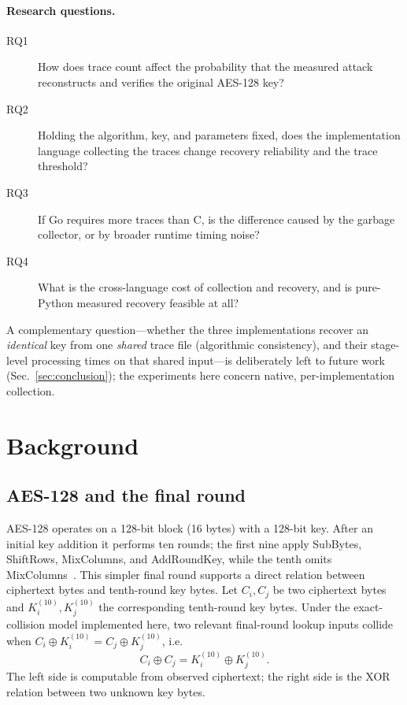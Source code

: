 \documentclass[11pt]{article}
\begin{document}
\paragraph{Research questions.}
\begin{description}
  \item[RQ1] How does trace count affect the probability that the measured
        attack reconstructs and verifies the original AES-128 key?
  \item[RQ2] Holding the algorithm, key, and parameters fixed, does the
        implementation language collecting the traces change recovery
        reliability and the trace threshold?
  \item[RQ3] If Go requires more traces than C, is the difference caused by the
        garbage collector, or by broader runtime timing noise?
  \item[RQ4] What is the cross-language cost of collection and recovery, and is
        pure-Python measured recovery feasible at all?
\end{description}
A complementary question---whether the three implementations recover an
\emph{identical} key from one \emph{shared} trace file (algorithmic
consistency), and their stage-level processing times on that shared
input---is deliberately left to future work (Sec.~\ref{sec:conclusion}); the
experiments here concern native, per-implementation collection.

\section{Background}
\label{sec:background}

\subsection{AES-128 and the final round}
AES-128 operates on a 128-bit block (16 bytes) with a 128-bit key. After an
initial key addition it performs ten rounds; the first nine apply SubBytes,
ShiftRows, MixColumns, and AddRoundKey, while the tenth omits
MixColumns~\cite{fips197}. This simpler final round supports a direct relation
between ciphertext bytes and tenth-round key bytes. Let $C_i, C_j$ be two
ciphertext bytes and $K^{(10)}_i, K^{(10)}_j$ the corresponding tenth-round key
bytes. Under the exact-collision model implemented here, two relevant final-round
lookup inputs collide when $C_i \oplus K^{(10)}_i = C_j \oplus K^{(10)}_j$, i.e.
\begin{equation}
C_i \oplus C_j = K^{(10)}_i \oplus K^{(10)}_j .
\label{eq:collision}
\end{equation}
The left side is computable from observed ciphertext; the right side is the XOR
relation between two unknown key bytes.
\end{document}
